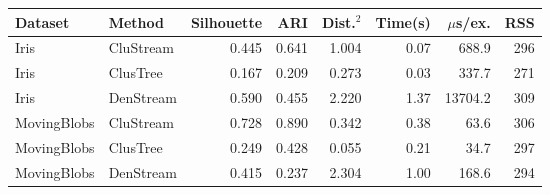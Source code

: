 \begin{tabular}{llrrrrrr}
\toprule
Dataset & Method & Silhouette & ARI & Dist.$^2$ & Time(s) & $\mu$s/ex. & RSS \\
\midrule
Iris & CluStream & 0.445 & 0.641 & 1.004 & 0.07 & 688.9 & 296 \\
Iris & ClusTree & 0.167 & 0.209 & 0.273 & 0.03 & 337.7 & 271 \\
Iris & DenStream & 0.590 & 0.455 & 2.220 & 1.37 & 13704.2 & 309 \\
MovingBlobs & CluStream & 0.728 & 0.890 & 0.342 & 0.38 & 63.6 & 306 \\
MovingBlobs & ClusTree & 0.249 & 0.428 & 0.055 & 0.21 & 34.7 & 297 \\
MovingBlobs & DenStream & 0.415 & 0.237 & 2.304 & 1.00 & 168.6 & 294 \\
\bottomrule
\end{tabular}
